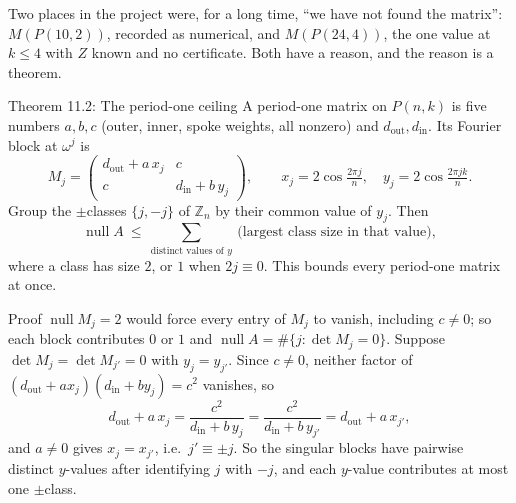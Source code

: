 \documentclass[11pt]{article}
\begin{document}
Two places in the project were, for a long time, ``we have not found the matrix'': $M(P(10,2))$, recorded as numerical, and $M(P(24,4))$, the one value at $k\le4$ with $Z$ known and no certificate. Both have a reason, and the reason is a theorem.

\begin{thmbox}{Theorem 11.2: The period-one ceiling}
A period-one matrix on $P(n,k)$ is five numbers $a,b,c$ (outer, inner, spoke weights, all nonzero) and $d_{\mathrm{out}},d_{\mathrm{in}}$. Its Fourier block at $\omega^j$ is
\begin{equation}
  M_j=\begin{pmatrix} d_{\mathrm{out}}+a\,x_j & c\\ c & d_{\mathrm{in}}+b\,y_j\end{pmatrix},\qquad
  x_j=2\cos\tfrac{2\pi j}{n},\quad y_j=2\cos\tfrac{2\pi jk}{n}.
\end{equation}
Group the $\pm$classes $\{j,-j\}$ of $\mathbb Z_n$ by their common value of $y_j$. Then
\begin{equation}
  \operatorname{null}A\ \le\ \sum_{\text{distinct values of }y}\ \bigl(\text{largest class size in that value}\bigr),
\end{equation}
where a class has size $2$, or $1$ when $2j\equiv0$. This bounds every period-one matrix at once.
\end{thmbox}

\begin{defbox}{Proof}
$\operatorname{null}M_j=2$ would force every entry of $M_j$ to vanish, including $c\ne0$; so each block contributes $0$ or $1$ and $\operatorname{null}A=\#\{j:\det M_j=0\}$. Suppose $\det M_j=\det M_{j'}=0$ with $y_j=y_{j'}$. Since $c\ne0$, neither factor of $(d_{\mathrm{out}}+ax_j)(d_{\mathrm{in}}+by_j)=c^2$ vanishes, so
\begin{equation}
  d_{\mathrm{out}}+a\,x_j=\frac{c^2}{d_{\mathrm{in}}+b\,y_j}=\frac{c^2}{d_{\mathrm{in}}+b\,y_{j'}}=d_{\mathrm{out}}+a\,x_{j'},
\end{equation}
and $a\ne0$ gives $x_j=x_{j'}$, i.e.\ $j'\equiv\pm j$. So the singular blocks have pairwise distinct $y$-values after identifying $j$ with $-j$, and each $y$-value contributes at most one $\pm$class. \qedhere
\end{defbox}
\end{document}
